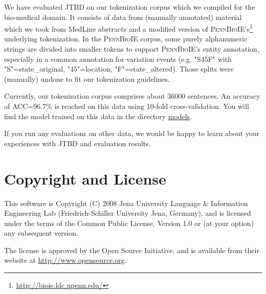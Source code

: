\documentclass[11pt,a4paper,halfparskip]{scrartcl}
\begin{document}
We have evaluated JTBD on our tokenization corpus which we compiled
for the bio-medical domain. It consists of data from (manually
annotated) material which we took from MedLine abstracts and a
modified version of
\textsc{PennBioIE}'s\footnote{\url{http://bioie.ldc.upenn.edu/}}
underlying tokenization. In the \textsc{PennBioIE} corpus, some purely
alphanumeric strings are divided into smaller tokens to support
\textsc{PennBioIE}'s entity annotation, especially in a common
annotation for variation events (e.g.  "S45F" with "S"=state\_original,
"45"=location, "F"=state\_altered).  Those splits were (manually)
undone to fit our tokenization guidelines.

Currently, our tokenization corpus comprises about 36000 sentences.
An accuracy of ACC=96.7\% is reached on this data using 10-fold
cross-validation.  You will find the model trained on this data in the
directory \url{models}.

If you run any evaluations on other data, we would be happy to learn about
your experiences with JTBD and evaluation results.

\section{Copyright and License}
This software is Copyright (C) 2008 Jena University Language \& Information
Engineering Lab (Friedrich-Schiller University Jena, Germany), and is
licensed under the terms of the Common Public License, Version 1.0 or (at
your option) any subsequent version.

The license is approved by the Open Source Initiative, and is
available from their website at \url{http://www.opensource.org}.



\end{document}
